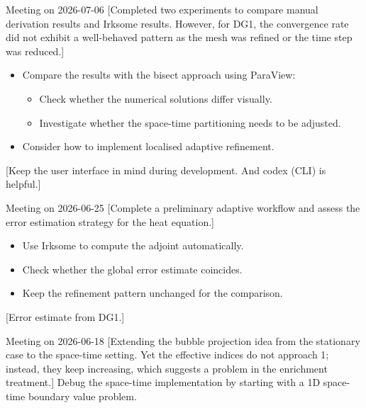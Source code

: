 \documentclass[11pt,a4paper]{article}
\begin{document}
\meet
{Meeting on 2026-07-06}
[Completed two experiments to compare manual derivation results and Irksome results. However, for DG1, the convergence rate did not exhibit a well-behaved pattern as the mesh was refined or the time step was reduced.]
{\begin{itemize}
    \item Compare the results with the bisect approach using ParaView:
    \begin{itemize}
        \item Check whether the numerical solutions differ visually.
        \item Investigate whether the space-time partitioning needs to be adjusted.
    \end{itemize}
    \item Consider how to implement localised adaptive refinement.
\end{itemize}}
[Keep the user interface in mind during development. And codex (CLI) is helpful.]
\vspace{1.5em}


\meet
{Meeting on 2026-06-25}
[Complete a preliminary adaptive workflow and assess the error estimation strategy for the heat equation.]
{\begin{itemize}
    \item Use Irksome to compute the adjoint automatically.
    \item Check whether the global error estimate coincides.
    \item Keep the refinement pattern unchanged for the comparison.
\end{itemize}
}
[Error estimate from DG1.]
\vspace{1.5em}


\meet
{Meeting on 2026-06-18}
[Extending the bubble projection idea from the stationary case to the space-time setting. Yet the effective indices do not approach 1; instead, they keep increasing, which suggests a problem in the enrichment treatment.]
{Debug the space-time implementation by starting with a 1D space-time boundary value problem.}
\vspace{1.5em}
\end{document}
